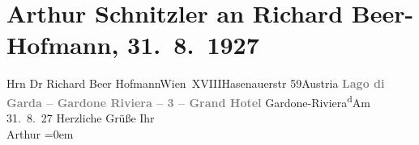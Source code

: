

         
         \renewcommand{\erwaehntePersonen}{Personen: Richard Beer-Hofmann}
         \renewcommand{\erwaehnteOrte}{Orte: Gardone Riviera, Grand Hotel Gardone, Hasenauerstraße, Lago di Garda, Wien, XVIII., Währing, Österreich}
         \renewcommand{\erwaehnteWerke}{}
               \section[Arthur Schnitzler an Richard Beer-Hofmann, 31. 8. 1927]{ Arthur Schnitzler an Richard Beer-Hofmann, 31. 8. 1927}\nopagebreak{}\rehead{ }\begin{ledgroupsized}[t]{13cm}\normalsize\beginnumbering \toendnotes[C]{\smallbreak\pagebreak[2]} 
\pstart{}{\pb}Hrn Dr Richard Beer Hofmann\pend{}\pstart{}Wien XVIII\pend{}\pstart{}Hasenauerstr 59\pend{}\pstart{}Austria\pend{}{\bigskip}\pstart
           \noindent{}\centering{}{\pb}\textcolor{gray}{\textbf{Lago di Garda – Gardone Riviera – 3 – Grand Hotel}}\pend
           \pstart
           \noindent{}{\pb}Gardone-Riviera\hfill \substVorne{}\textsuperscript{d}\substDazwischen{}A\substHinten{}m 31. 8. 27\pend
           \pstart
           Herzliche Grüße\pend
           \pstart
           Ihr{\\[\baselineskip]}\spacefill\mbox{Arthur}\pend
           \leftskip=0em{}
         
         \endnumbering{}\end{ledgroupsized}  \newcommand{\dateiname}{L02491}\newcommand{\titel}{Arthur Schnitzler an Richard Beer-Hofmann, 31. 8. 1927}\newcommand{\editorInnen}{Martin Anton Müller und Gerd-Hermann Susen}
      